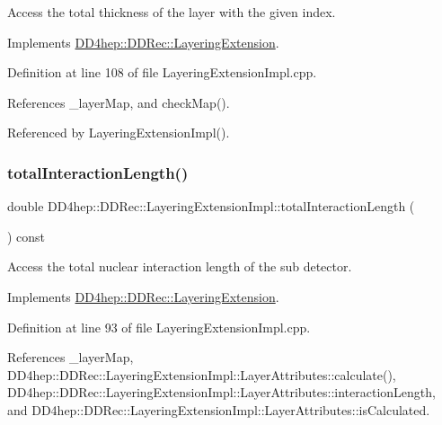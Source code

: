 Access the total thickness of the layer with the given index. 



Implements \hyperlink{class_d_d4hep_1_1_d_d_rec_1_1_layering_extension_a6510f43f195374e6adfb4312c27da450}{D\+D4hep\+::\+D\+D\+Rec\+::\+Layering\+Extension}.



Definition at line 108 of file Layering\+Extension\+Impl.\+cpp.



References \+\_\+layer\+Map, and check\+Map().



Referenced by Layering\+Extension\+Impl().

\hypertarget{class_d_d4hep_1_1_d_d_rec_1_1_layering_extension_impl_ad90a8ec4d00d9aff220e9091d822a009}{}\label{class_d_d4hep_1_1_d_d_rec_1_1_layering_extension_impl_ad90a8ec4d00d9aff220e9091d822a009} 
\subsubsection{\texorpdfstring{total\+Interaction\+Length()}{totalInteractionLength()}}
{\footnotesize\ttfamily double D\+D4hep\+::\+D\+D\+Rec\+::\+Layering\+Extension\+Impl\+::total\+Interaction\+Length (\begin{DoxyParamCaption}{ }\end{DoxyParamCaption}) const\hspace{0.3cm}{\ttfamily [virtual]}}



Access the total nuclear interaction length of the sub detector. 



Implements \hyperlink{class_d_d4hep_1_1_d_d_rec_1_1_layering_extension_aa5440bf9dc11305a785765ca155437fa}{D\+D4hep\+::\+D\+D\+Rec\+::\+Layering\+Extension}.



Definition at line 93 of file Layering\+Extension\+Impl.\+cpp.



References \+\_\+layer\+Map, D\+D4hep\+::\+D\+D\+Rec\+::\+Layering\+Extension\+Impl\+::\+Layer\+Attributes\+::calculate(), D\+D4hep\+::\+D\+D\+Rec\+::\+Layering\+Extension\+Impl\+::\+Layer\+Attributes\+::interaction\+Length, and D\+D4hep\+::\+D\+D\+Rec\+::\+Layering\+Extension\+Impl\+::\+Layer\+Attributes\+::is\+Calculated.



